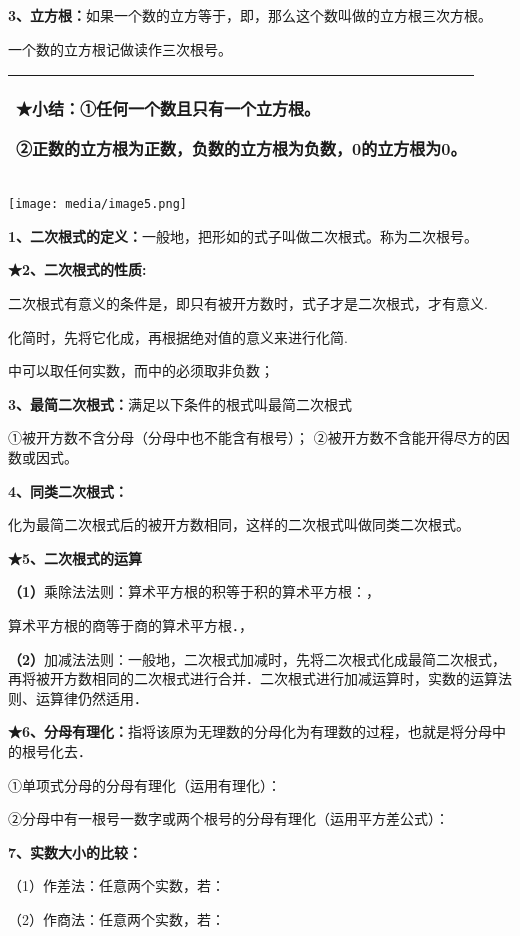\documentclass[a4paper,11pt,UTF8]{ctexart}
\begin{document}
\textbf{3、立方根：}如果一个数的立方等于，即，那么这个数叫做的立方根三次方根。

一个数的立方根记做读作三次根号。

\begin{longtable}[]{@{}l@{}}
\toprule
\endhead
\begin{minipage}[t]{0.97\columnwidth}\raggedright
★小结：①任何一个数且只有一个立方根。

②正数的立方根为正数，负数的立方根为负数，0的立方根为0。\strut
\end{minipage}\tabularnewline
\bottomrule
\end{longtable}

\texttt{[image: media/image5.png]}

\textbf{1、二次根式的定义：}一般地，把形如的式子叫做二次根式。称为二次根号。

\textbf{★2、二次根式的性质:}

二次根式有意义的条件是，即只有被开方数时，式子才是二次根式，才有意义.

化简时，先将它化成，再根据绝对值的意义来进行化简.

中可以取任何实数，而中的必须取非负数；

\textbf{3、最简二次根式：}满足以下条件的根式叫最简二次根式

①被开方数不含分母（分母中也不能含有根号）；
②被开方数不含能开得尽方的因数或因式。

\textbf{4、同类二次根式：}

化为最简二次根式后的被开方数相同，这样的二次根式叫做同类二次根式。

\textbf{★5、二次根式的运算}

\textbf{（1）}乘除法法则：算术平方根的积等于积的算术平方根：，

算术平方根的商等于商的算术平方根．，

\textbf{（2）}加减法法则：一般地，二次根式加减时，先将二次根式化成最简二次根式，再将被开方数相同的二次根式进行合并．二次根式进行加减运算时，实数的运算法则、运算律仍然适用．

\textbf{★6、分母有理化：}指将该原为无理数的分母化为有理数的过程，也就是将分母中的根号化去．

①单项式分母的分母有理化（运用有理化）：

②分母中有一根号一数字或两个根号的分母有理化（运用平方差公式）：

\textbf{7、实数大小的比较：}

（1）作差法：任意两个实数，若：

（2）作商法：任意两个实数，若：
\end{document}

